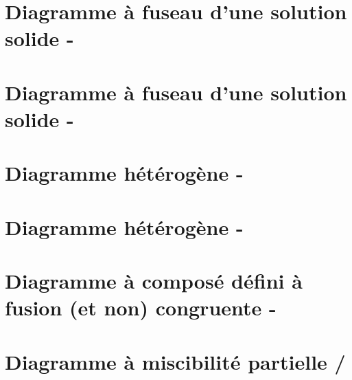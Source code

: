\documentclass[a4paper,14pt]{article}
\begin{document}
%

\section{Diagramme à fuseau d'une solution solide -}


\section{Diagramme à fuseau d'une solution solide -}


\section{Diagramme hétérogène -}


\section{Diagramme hétérogène -}


%

\section{Diagramme à composé défini à fusion (et non) congruente -}


\section{Diagramme à miscibilité partielle /}


%
\end{document}
